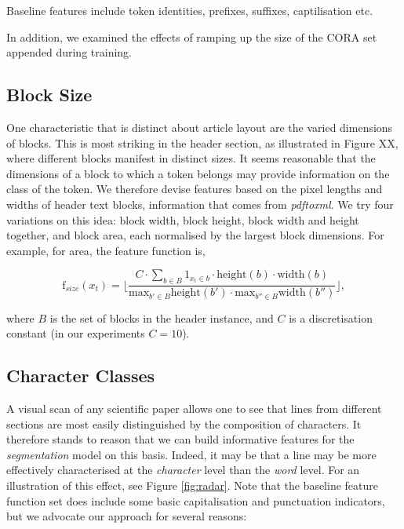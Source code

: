 Baseline features include token identities, prefixes, suffixes, captilisation etc.

In addition, we examined the effects of ramping up the size of the CORA set appended during training.

\subsection{Block Size}

One characteristic that is distinct about article layout are the varied dimensions of blocks. This is most striking in the header section, as illustrated in Figure XX, where different blocks manifest in distinct sizes. It seems reasonable that the dimensions of a block to which a token belongs may provide information on the class of the token. We therefore devise features based on the pixel lengths and widths of header text blocks, information that comes from \emph{pdftoxml}. We try four variations on this idea: block width, block height, block width and height together, and block area, each normalised by the largest block dimensions. For example, for area, the feature function is,

\begin{equation}
\text{f}_{size}(x_t) =  \Bigg\lfloor\frac{C \cdot \sum_{b \in B} 1_{x_t \in b} \cdot\text{height}(b)\cdot\text{width}(b)}{\text{max}_{b' \in B} \text{height}(b') \cdot \text{max}_{b'' \in B} \text{width}(b'')} \Bigg\rfloor,
\label{eq:areafunction}
\end{equation}

where $B$ is the set of blocks in the header instance, and $C$ is a discretisation constant (in our experiments $C = 10$).

\subsection{Character Classes}
\label{subsec:characterclasses}
A visual scan of any scientific paper allows one to see that lines from different sections are most easily distinguished by the composition of characters. It therefore stands to reason that we can build informative features for the \emph{segmentation} model on this basis. Indeed, it may be that a line may be more effectively characterised at the \emph{character} level than the \emph{word} level. For an illustration of this effect, see Figure \ref{fig:radar}. Note that the baseline feature function set does include some basic capitalisation and punctuation indicators, but we advocate our approach for several reasons:

